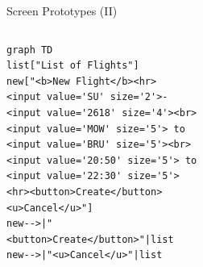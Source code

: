 \documentclass[aspectratio=43,handout,bigger]{beamer}
\begin{document}
\begin{frame}[fragile]{Screen Prototypes (II)}
  \begin{columns}
    \begin{column}{.6\textwidth}
\begin{verbatim}
graph TD
list["List of Flights"]
new["<b>New Flight</b><hr>
<input value='SU' size='2'>-
<input value='2618' size='4'><br>
<input value='MOW' size='5'> to
<input value='BRU' size='5'><br>
<input value='20:50' size='5'> to
<input value='22:30' size='5'>
<hr><button>Create</button>
<u>Cancel</u>"]
new-->|"
<button>Create</button>"|list
new-->|"<u>Cancel</u>"|list
\end{verbatim}
    \end{column}
    \begin{column}{.3\textwidth}
    \end{column}
  \end{columns}
\end{frame}
\end{document}

